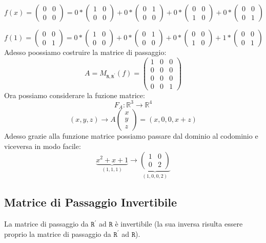 $$ f(x) = \begin{pmatrix}0 & 0 \\ 0 & 0 \end{pmatrix} = 0*\begin{pmatrix}
1 & 0 \\ 0 & 0
\end{pmatrix}
+0*
\begin{pmatrix}
0 & 1 \\ 0 & 0
\end{pmatrix}
+0*
\begin{pmatrix}
0 & 0 \\ 1 & 0
\end{pmatrix}
+0*
\begin{pmatrix}
0 & 0 \\ 0 & 1
\end{pmatrix} $$

$$ f(1) = \begin{pmatrix}0 & 0 \\ 0 & 1 \end{pmatrix} = 0*\begin{pmatrix}
1 & 0 \\ 0 & 0
\end{pmatrix}
+0*
\begin{pmatrix}
0 & 1 \\ 0 & 0
\end{pmatrix}
+0*
\begin{pmatrix}
0 & 0 \\ 1 & 0
\end{pmatrix}
+1*
\begin{pmatrix}
0 & 0 \\ 0 & 1
\end{pmatrix} $$
Adesso poossiamo costruire la matrice di passaggio:
$$
A = M_{\mathtt{R},\mathtt{R}^{\prime}}(f) = 
\begin{pmatrix}
1 & 0 & 0 \\
0 & 0 & 0 \\
0 & 0 & 0 \\
0 & 0 & 1 
\end{pmatrix}
$$
Ora possiamo considerare la fuzione matrice:
$$ F_A: \mathbb{R}^3 \rightarrow \mathbb{R}^4 $$
$$ (x,y,z) \rightarrow A \begin{pmatrix}x \\ y \\ z \end{pmatrix} = (x,0,0,x+z)$$
Adesso grazie alla funzione matrice possiamo passare dal dominio al codominio e viceversa in modo facile:
$$ \underbrace{x^2+x+1}_{(1,1,1)} \rightarrow \underbrace{\begin{pmatrix}1 & 0 \\ 0 & 2\end{pmatrix}}_{(1,0,0,2)}  $$ 

\subsection{Matrice di Passaggio Invertibile}
La matrice di passaggio da $\mathtt{R}^{\prime}$ ad $\mathtt{R}$ è invertibile (la sua inversa risulta essere proprio la matrice di passaggio da $\mathtt{R}^{\prime}$ ad $\mathtt{R}$).




